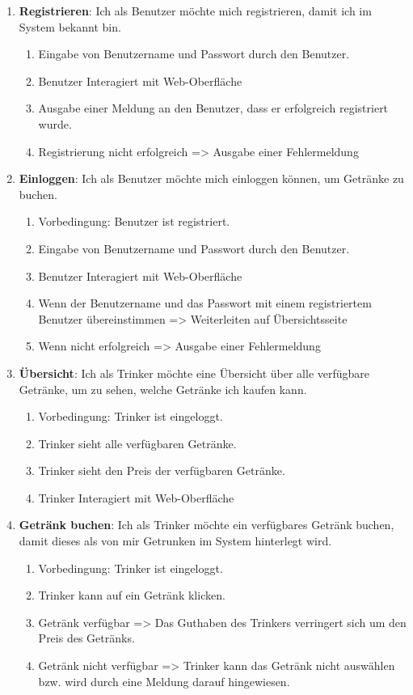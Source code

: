 \documentclass[conference,a4paper]{cs-techrep}
\begin{document}
\begin{enumerate}[{USM}1]
	
\item \textbf{Registrieren}: Ich als Benutzer möchte mich registrieren, damit ich im System bekannt bin.
	\begin{enumerate}
	\item Eingabe von Benutzername und Passwort durch den Benutzer.
	\item Benutzer Interagiert mit Web-Oberfläche
	\item Ausgabe einer Meldung an den Benutzer, dass er erfolgreich registriert wurde.
	\item Registrierung  nicht erfolgreich => Ausgabe einer Fehlermeldung
	\end{enumerate}

\item \textbf{Einloggen}: Ich als Benutzer möchte mich einloggen können, um Getränke zu buchen.
\begin{enumerate}
	\item Vorbedingung: Benutzer ist registriert.
	\item Eingabe von Benutzername und Passwort durch den Benutzer.
	\item Benutzer Interagiert mit Web-Oberfläche
	\item Wenn der Benutzername und das Passwort mit einem registriertem Benutzer übereinstimmen => Weiterleiten auf Übersichtsseite
	\item Wenn nicht erfolgreich => Ausgabe einer Fehlermeldung
\end{enumerate}

\item \textbf{Übersicht}: Ich als Trinker möchte eine Übersicht über alle verfügbare Getränke, um zu sehen, welche Getränke ich kaufen kann.
\begin{enumerate}
	\item Vorbedingung: Trinker ist eingeloggt.
	\item Trinker sieht alle verfügbaren Getränke.
	\item Trinker sieht den Preis der verfügbaren Getränke.
	\item Trinker Interagiert mit Web-Oberfläche
\end{enumerate}

\item \textbf{Getränk buchen}: Ich als Trinker möchte ein verfügbares Getränk buchen, damit dieses als von mir Getrunken im System hinterlegt wird.
\begin{enumerate}
	\item Vorbedingung: Trinker ist eingeloggt.
	\item Trinker kann auf ein Getränk klicken.
	\item Getränk verfügbar => Das Guthaben des Trinkers verringert sich um den Preis des Getränks.
	\item Getränk nicht verfügbar => Trinker kann das Getränk nicht auswählen bzw. wird durch eine Meldung darauf hingewiesen.
\end{enumerate}


\end{enumerate}
\end{document}
